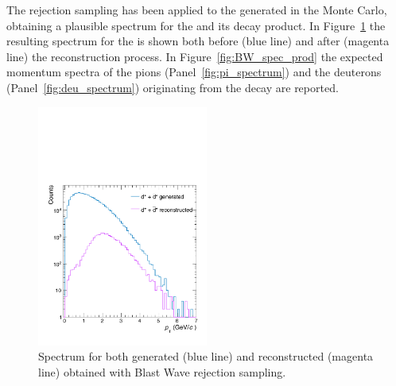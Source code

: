 The rejection sampling has been applied to the \ds generated in the Monte Carlo, obtaining a 
plausible \pt spectrum for the \ds and its decay product. In Figure~\ref{fig:bw_spectrum} the
resulting \pt spectrum for the \ds is shown both before (blue line) and after (magenta line) the
reconstruction process. 
In Figure~\ref{fig:BW_spec_prod} the expected momentum spectra of the pions 
(Panel~\ref{fig:pi_spectrum}) and the deuterons (Panel~\ref{fig:deu_spectrum}) originating from
the \ds decay are reported.

\begin{figure}
    \centering
    \includegraphics[width=0.5\textwidth]{gfx/genrecBW}
	\caption{Spectrum for both generated (blue line) and reconstructed (magenta line) \ds obtained with Blast Wave rejection sampling.}
	\label{fig:bw_spectrum}
\end{figure}

